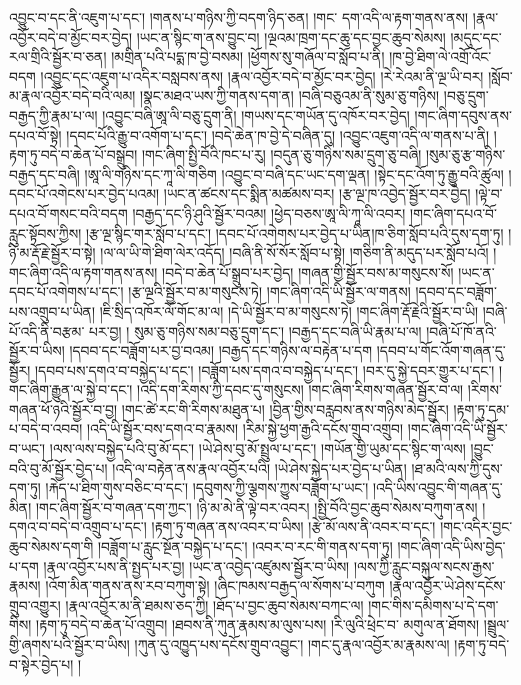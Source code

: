 འབྱུང་བ་དང་ནི་འཇུག་པ་དང་། །གནས་པ་གཉིས་ཀྱི་བདག་ཉིད་ཅན། །གང་​ དག་འདི་ལ་རྟག་གནས་ནས། །རྣལ་འབྱོར་བདེ་བ་མྱོང་བར་བྱེད། །ཡང་ན་སྙིང་ག་ནས་བྱུང་བ། །ལྔའམ་ཁྲག་དང་ཆུ་དང་བྱང་ཆུབ་སེམས། །མདུང་དང་རལ་གྲིའི་སྦྱོར་བ་ཅན། །མགྲིན་པའི་པདྨ་ཁ་བྱེ་བསམ། །ཕྱོགས་སུ་གཞོལ་བ་སློབ་པ་ནི། །ཁ་བྱེ་ཐིག་ལེ་འགྲོ་འོང་བདག །འབྱུང་དང་འཇུག་པ་འདིར་བསླབས་ནས། །རྣལ་འབྱོར་བདེ་བ་མྱོང་བར་བྱེད། །རེ་རེའམ་ནི་ལྔ་ཡི་བར། །སློབ་མ་རྣལ་འབྱོར་བདེ་བའི་ལམ། །སྣང་མཐའ་ཡས་ཀྱི་གནས་དག་ན། །བཞི་བཅུའམ་ནི་སུམ་ཅུ་གཉིས། །བཅུ་དྲུག་བརྒྱད་ཀྱི་རྣམ་པ་ལ། །འབྱུང་བཞི་ཨཱ་ལི་བཅུ་དྲུག་ནི། །གཡས་དང་གཡོན་དུ་འཁོར་བར་བྱེད། །གང་ཞིག་དབུས་ནས་དཔའ་བོ་སྟེ། །དབང་པོའི་རྒྱུ་བ་འགོག་པ་དང་། །བདེ་ཆེན་ཁ་བྱེ་དེ་བཞིན་དུ། །འབྱུང་འཇུག་འདི་ལ་གནས་པ་ནི། །རྟག་ཏུ་བདེ་བ་ཆེན་པོ་བསྒྲུབ། །གང་ཞིག་སྤྱི་བོའི་ཁང་པ་རུ། །བདུན་ཅུ་གཉིས་སམ་དྲུག་ཅུ་བཞི། །སུམ་ཅུ་རྩ་གཉིས་བརྒྱད་དང་བཞི། །ཨཱ་ལི་གཉིས་དང་ཀཱ་ལི་གཅིག །འབྱུང་བ་བཞི་དང་ཡང་དག་ལྡན། །སྟེང་དང་འོག་ཏུ་རྒྱུ་བའི་ཚུལ། །དབང་པོ་འགེངས་པར་བྱེད་པའམ། །ཡང་ན་ཚངས་དང་སྨིན་མཚམས་བར། །རྩ་ལྔ་ཁ་འབྱེད་སྦྱོར་བར་བྱེད། །ལྟེ་བ་དཔའ་བོ་གསང་བའི་བདག །བརྒྱད་དང་ཉི་ཤུའི་སྦྱོར་བའམ། །ཕྱེད་བཅས་ཨཱ་ལི་ཀཱ་ལི་འབར། །གང་ཞིག་དཔའ་བོ་རླུང་སྟོབས་ཀྱིས། །རྩ་ལྔ་སྙིང་གར་སློབ་པ་དང་། །དབང་པོ་འགེགས་པར་བྱེད་པ་ཡིན།ཁ་ཅིག་སློབ་པའི་དུས་དག་ཏུ། །ཉི་མ་རྡོ་རྗེ་སྦྱོར་བ་སྟེ། །ལ་ལ་ཡི་གེ་ཐིག་ལེར་འདོད། །བཞི་ནི་སོ་སོར་སློབ་པ་སྟེ། །གཅིག་ནི་མདུད་པར་སློབ་པའོ། །གང་ཞིག་འདི་ལ་རྟག་གནས་ནས། །བདེ་བ་ཆེན་པོ་སྒྲུབ་པར་བྱེད། །གཞན་གྱི་སྦྱོར་བས་མ་གསུངས་སོ། །ཡང་ན་དབང་པོ་འགེགས་པ་དང་། །རྩ་ལྔའི་སྦྱོར་བ་མ་གསུངས་ཏེ། །གང་ཞིག་འདི་ཡི་སྦྱོར་ལ་གནས། །དབབ་དང་བཟློག་པས་འགྲུབ་པ་ཡིན། །ཇི་སྲིད་འཁོར་ལོ་གོང་མ་ལ། །དེ་ཡི་སྦྱོར་བ་མ་གསུངས་ཏེ། །གང་ཞིག་རྡོ་རྗེའི་སྦྱོར་བ་ཡི། །བཞི་པོ་འདི་ནི་བརྩམ་​ པར་བྱ། །
སུམ་ཅུ་གཉིས་སམ་བཅུ་དྲུག་དང་། །བརྒྱད་དང་བཞི་ཡི་རྣམ་པ་ལ། །བཞི་པོ་ཁོ་ནའི་སྦྱོར་བ་ཡིས། །དབབ་དང་བཟློག་པར་བྱ་བའམ། །བརྒྱད་དང་གཉིས་ལ་བརྟེན་པ་དག །དབབ་པ་གོང་འོག་གཞན་དུ་སྦྱོར། །དབབ་པས་དགའ་བ་བསྐྱེད་པ་དང་། །བཟློག་པས་དགའ་བ་བསྐྱེད་པ་དང་། །བར་དུ་སྐྱེ་དབར་གྱུར་པ་དང་། །གང་ཞིག་རྒྱུན་ལ་སྐྱེ་བ་དང་། །འདི་དག་རིགས་ཀྱི་དབང་དུ་གསུངས། །གང་ཞིག་རིགས་གཞན་སྦྱོར་བ་ལ། །རིགས་གཞན་ཕོ་ཉའི་སྦྱོར་བ་བྱ། །གང་ཚེ་རང་གི་རིགས་མཐུན་པ། །བྱིན་གྱིས་བརླབས་ནས་གཉིས་མེད་སྦྱོར། །རྟག་ཏུ་དམ་པ་བདེ་བ་འབབ། །འདི་ཡི་སྦྱོར་བས་དགའ་བ་རྣམས། །རིམ་སྐྱེ་ཕྱག་རྒྱའི་དངོས་གྲུབ་འགྲུབ། །གང་ཞིག་འདི་ཡི་སྦྱོར་བ་ཡང་། །ལས་ལས་བསྐྱེད་པའི་བུ་མོ་དང་། །ཡེ་ཤེས་བུ་མོ་སྤྲུལ་པ་དང་། །གཡོན་གྱི་ཡུམ་དང་སྙིང་ག་ལས། །བྱུང་བའི་བུ་མོ་སྦྱོར་བྱེད་པ། །འདི་ལ་བརྟེན་ནས་རྣལ་འབྱོར་པའི། །ཡེ་ཤེས་སྐྱེད་པར་བྱེད་པ་ཡིན། །ཐ་མའི་ལས་ཀྱི་དུས་དག་ཏུ། །རྐེད་པ་ཐིག་གུས་བཅིང་བ་དང་། །དབུགས་ཀྱི་ལྕགས་ཀྱུས་བཟློག་པ་ཡང་། །འདི་ཡིས་འབྱུང་གི་གཞན་དུ་མིན། །གང་ཞིག་སྦྱོར་བ་གཞན་དག་ཀྱང་། །ཉི་མ་མེ་ནི་ལྟེ་བར་འབར། །སྤྱི་བོའི་བྱང་ཆུབ་སེམས་བཀུག་ནས། །དགའ་བ་བདེ་བ་འགྲུབ་པ་དང་། །རྟག་ཏུ་གཞན་ནས་འབར་བ་ཡིས། །རྩེ་མོ་ལས་ནི་འབར་བ་དང་། །གང་འདིར་བྱང་ཆུབ་སེམས་དག་གི །བཟློག་པ་རླུང་སྔོན་བསྐྱེད་པ་དང་། །འབར་བ་རང་གི་གནས་དག་ཏུ། །གང་ཞིག་འདི་ཡིས་བྱེད་པ་དག །རྣལ་འབྱོར་པས་ནི་སྤྱད་པར་བྱ། །ཡང་ན་འབྱེད་འཛུམས་སྦྱོར་བ་ཡིས། །ལས་ཀྱི་རླུང་བསྐུལ་སངས་རྒྱས་རྣམས། །འོག་མིན་གནས་ནས་རབ་བཀུག་སྟེ། །ཞིང་ཁམས་བརྒྱད་ལ་སོགས་པ་བཀུག །རྣལ་འབྱོར་ཡེ་ཤེས་དངོས་གྲུབ་འགྱུར། །རྣལ་འབྱོར་མ་ནི་ཐམས་ཅད་ཀྱི། །ཐོད་པ་བྱང་ཆུབ་སེམས་བཀང་ལ། །གང་གིས་དམིགས་པ་དེ་དག་གིས། །རྟག་ཏུ་བདེ་བ་ཆེན་པོ་འགྲུབ། །ཐབས་ནི་ཀུན་རྣམས་མ་ལུས་པས། །རི་ལུའི་ཕྲེང་བ་​ མགུལ་ན་ཐོགས། །སྦྲུལ་གྱི་ཞགས་པའི་སྦྱོར་བ་ཡིས། །ཀུན་དུ་འཁྱུད་པས་དངོས་གྲུབ་འབྱུང་། །གང་དུ་རྣལ་འབྱོར་མ་རྣམས་ལ། །རྟག་ཏུ་བདེ་བ་སྟེར་བྱེད་པ། །
